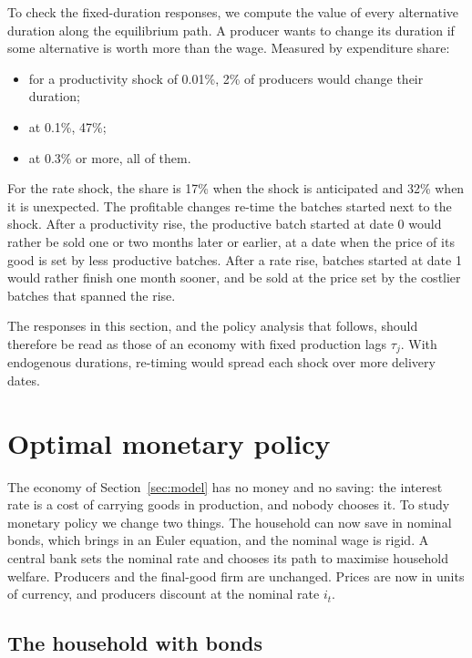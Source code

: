 \documentclass[11pt]{article}
\theoremstyle{definition}
\begin{document}
To check the fixed-duration responses, we compute the value of every alternative duration along the
equilibrium path. A producer wants to change its duration if some alternative is worth more than the
wage. Measured by expenditure share:
\begin{itemize}
  \item for a productivity shock of 0.01\%, 2\% of producers would change their duration;
  \item at 0.1\%, 47\%;
  \item at 0.3\% or more, all of them.
\end{itemize}
For the rate shock, the share is 17\% when the shock is anticipated and 32\% when it is unexpected. The profitable changes re-time the batches started next to the shock. After a productivity
rise, the productive batch started at date 0 would rather be sold one or two months later or earlier, at a
date when the price of its good is set by less productive batches. After a rate rise, batches started
at date 1 would rather finish one month sooner, and be sold at the price set by the costlier batches
that spanned the rise.

The responses in this section, and the policy analysis that follows, should therefore be read as
those of an economy with fixed production lags $\tau_j$. With endogenous durations, re-timing
would spread each shock over more delivery dates.

\section{Optimal monetary policy}\label{sec:policy}

The economy of Section~\ref{sec:model} has no money and no saving: the interest rate is a cost of
carrying goods in production, and nobody chooses it. To study monetary policy we change two
things. The household can now save in nominal bonds, which brings in an Euler equation, and the
nominal wage is rigid. A central bank sets the nominal rate and chooses its path to maximise
household welfare. Producers and the final-good firm are unchanged. Prices are now in units of
currency, and producers discount at the nominal rate $i_t$.

\subsection{The household with bonds}\label{sec:hhbonds}
\end{document}
